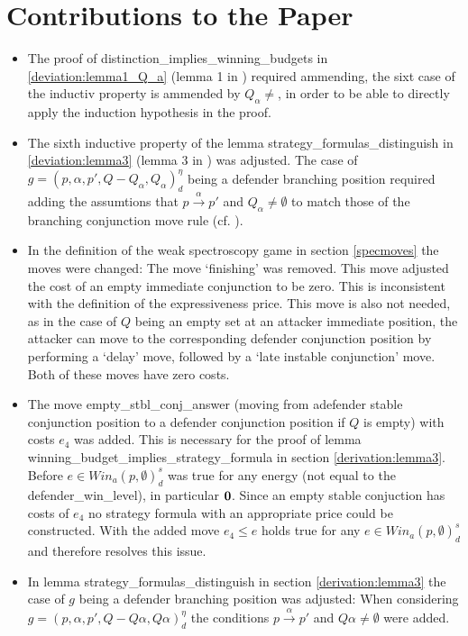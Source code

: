 \section{Contributions to the Paper}
\begin{itemize}
    \item The proof of distinction\_implies\_winning\_budgets in \ref{deviation:lemma1_Q_a} 
    (lemma 1 in \cite{bisping2023lineartimebranchingtime}) required ammending, the sixt case
    of the inductiv property is ammended by $Q_\alpha \neq {}$, in order to be able to directly
    apply the induction hypothesis in the proof.

    \item The sixth inductive property of the lemma strategy\_formulas\_distinguish in \ref{deviation:lemma3} 
    (lemma 3 in \cite{bisping2023lineartimebranchingtime}) was adjusted.
    The case of $g=(p,\alpha ,p', Q- Q_\alpha, Q_\alpha)_d^\eta$ being a defender branching position
    required adding the assumtions that $p \overset{\alpha}{\longrightarrow} p'$ and $Q_\alpha \neq \emptyset$
    to match those of the branching conjunction move rule (cf. \cite[p. 13]{bisping2023lineartimebranchingtime}). 

    \item In the definition of the weak spectroscopy game in section \ref{specmoves} the moves were changed: 
    The move `finishing' was removed. This move adjusted the cost of an empty immediate conjunction to be zero.
    This is inconsistent with the definition of the expressiveness price. This move is also not needed, as in the case of $Q$ being an empty set at an attacker immediate position, the attacker can move to the corresponding
    defender conjunction position by performing a `delay' move, followed by a `late instable conjunction' move. Both of these moves have zero costs.

    \item The move empty\_stbl\_conj\_answer (moving from adefender stable conjunction position to a defender conjunction
    position if $Q$ is empty) with costs $e_4$ was added. This is necessary for the proof of lemma 
    winning\_budget\_implies\_strategy\_formula in section \ref{derivation:lemma3}. Before 
    $e \in Win_a (p, \emptyset)_d^s $ was true for any energy (not equal to the defender\_win\_level), in particular $\bold{0}$. 
    Since an empty stable conjuction has costs of $e_4$ no strategy formula with an appropriate price could be constructed. 
    With the added move $e_4 \leq e $ holds true for any $e \in Win_a (p, \emptyset)_d^s $ and therefore resolves this issue.

    \item In lemma strategy\_formulas\_distinguish in section \ref{derivation:lemma3} the case of $g$ being a defender branching position was adjusted: 
    When considering $g=(p,\alpha ,p', Q- Q \alpha, Q \alpha)_d^\eta$ the conditions $p \overset{\alpha}{\longrightarrow} p'$ and $Q \alpha \neq \emptyset$ were added. 
\end{itemize}
